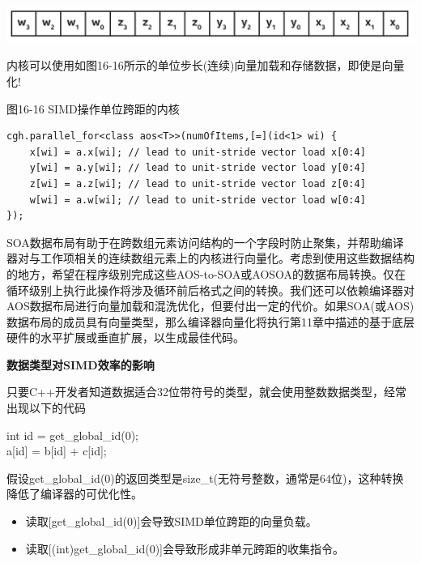 \begin{center}
	\includegraphics[width=1.0\textwidth]{content/chapter-16/images/9}
\end{center}

内核可以使用如图16-16所示的单位步长(连续)向量加载和存储数据，即使是向量化!

\hspace*{\fill} \par %
图16-16 SIMD操作单位跨距的内核
\begin{lstlisting}[caption={}]
cgh.parallel_for<class aos<T>>(numOfItems,[=](id<1> wi) {
	x[wi] = a.x[wi]; // lead to unit-stride vector load x[0:4]
	y[wi] = a.y[wi]; // lead to unit-stride vector load y[0:4]
	z[wi] = a.z[wi]; // lead to unit-stride vector load z[0:4]
	w[wi] = a.w[wi]; // lead to unit-stride vector load w[0:4]
});
\end{lstlisting}

SOA数据布局有助于在跨数组元素访问结构的一个字段时防止聚集，并帮助编译器对与工作项相关的连续数组元素上的内核进行向量化。考虑到使用这些数据结构的地方，希望在程序级别完成这些AOS-to-SOA或AOSOA的数据布局转换。仅在循环级别上执行此操作将涉及循环前后格式之间的转换。我们还可以依赖编译器对AOS数据布局进行向量加载和混洗优化，但要付出一定的代价。如果SOA(或AOS)数据布局的成员具有向量类型，那么编译器向量化将执行第11章中描述的基于底层硬件的水平扩展或垂直扩展，以生成最佳代码。\par

\hspace*{\fill} \par %
\textbf{数据类型对SIMD效率的影响}

只要C++开发者知道数据适合32位带符号的类型，就会使用整数数据类型，经常出现以下的代码\par

\begin{tcolorbox}[colback=white,colframe=black]
int id = get\_global\_id(0); \\a[id] = b[id] + c[id];
\end{tcolorbox}

假设get\_global\_id(0)的返回类型是size\_t(无符号整数，通常是64位)，这种转换降低了编译器的可优化性。

\begin{itemize}
	\item 读取[get\_global\_id(0)]会导致SIMD单位跨距的向量负载。
	\item 读取[(int)get\_global\_id(0)]会导致形成非单元跨距的收集指令。
\end{itemize}

